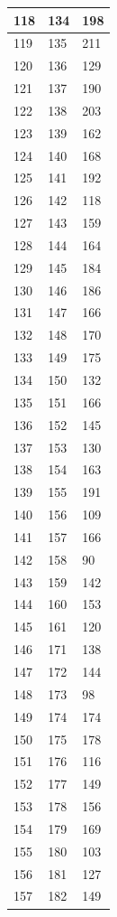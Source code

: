 \begin{tabular}{p{}p{}p{}}
\hline
118 & 134 & 198 \\
\hline
119 & 135 & 211 \\
\hline
120 & 136 & 129 \\
\hline
121 & 137 & 190 \\
\hline
122 & 138 & 203 \\
\hline
123 & 139 & 162 \\
\hline
124 & 140 & 168 \\
\hline
125 & 141 & 192 \\
\hline
126 & 142 & 118 \\
\hline
127 & 143 & 159 \\
\hline
128 & 144 & 164 \\
\hline
129 & 145 & 184 \\
\hline
130 & 146 & 186 \\
\hline
131 & 147 & 166 \\
\hline
132 & 148 & 170 \\
\hline
133 & 149 & 175 \\
\hline
134 & 150 & 132 \\
\hline
135 & 151 & 166 \\
\hline
136 & 152 & 145 \\
\hline
137 & 153 & 130 \\
\hline
138 & 154 & 163 \\
\hline
139 & 155 & 191 \\
\hline
140 & 156 & 109 \\
\hline
141 & 157 & 166 \\
\hline
142 & 158 & 90 \\
\hline
143 & 159 & 142 \\
\hline
144 & 160 & 153 \\
\hline
145 & 161 & 120 \\
\hline
146 & 171 & 138 \\
\hline
147 & 172 & 144 \\
\hline
148 & 173 & 98 \\
\hline
149 & 174 & 174 \\
\hline
150 & 175 & 178 \\
\hline
151 & 176 & 116 \\
\hline
152 & 177 & 149 \\
\hline
153 & 178 & 156 \\
\hline
154 & 179 & 169 \\
\hline
155 & 180 & 103 \\
\hline
156 & 181 & 127 \\
\hline
157 & 182 & 149 \\

\end{tabular}
